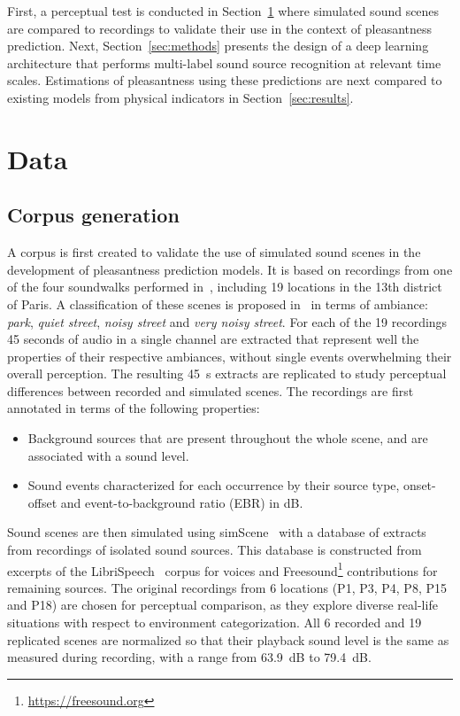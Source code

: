 \documentclass[11pt,a4paper]{article}
\begin{document}
First, a perceptual test is conducted in Section~\ref{sec:data} where simulated sound scenes are compared to recordings to validate their use in the context of pleasantness prediction. Next, Section~\ref{sec:methods} presents the design of a deep learning architecture that performs multi-label sound source recognition at relevant time scales. Estimations of pleasantness using these predictions are next compared to existing models from physical indicators in Section~\ref{sec:results}.


\section{Data}
\label{sec:data}

\subsection{Corpus generation}
\label{sec:data_corp}

A corpus is first created to validate the use of simulated sound scenes in the development of pleasantness prediction models. It is based on recordings from one of the four soundwalks performed in~\cite{aumond2017}, including 19 locations in the 13th district of Paris. A classification of these scenes is proposed in~\cite{gloaguen2017} in terms of ambiance: \textit{park}, \textit{quiet street}, \textit{noisy street} and \textit{very noisy street}. For each of the 19 recordings 45 seconds of audio in a single channel are extracted that represent well the properties of their respective ambiances, without single events overwhelming their overall perception. The resulting 45~s extracts are replicated to study perceptual differences between recorded and simulated scenes. The recordings are first annotated in terms of the following properties:

\begin{itemize}
\item Background sources that are present throughout the whole scene, and are associated with a sound level.
\item Sound events characterized for each occurrence by their source type, onset-offset and event-to-background ratio (EBR) in dB.
\end{itemize}

Sound scenes are then simulated using simScene~\cite{rossignol2015} with a database of extracts from recordings of isolated sound sources. This database is constructed from excerpts of the LibriSpeech~\cite{panayotov2015} corpus for voices and Freesound\footnote{\url{https://freesound.org}} contributions for remaining sources. The original recordings from 6 locations (P1, P3, P4, P8, P15 and P18) are chosen for perceptual comparison, as they explore diverse real-life situations with respect to environment categorization. All 6 recorded and 19 replicated scenes are normalized so that their playback sound level is the same as measured during recording, with a range from 63.9~dB to 79.4~dB.\\
\end{document}
